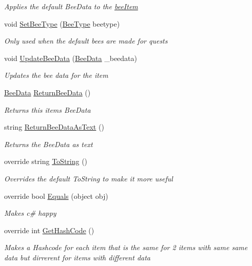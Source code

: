 \begin{DoxyCompactItemize}
\begin{DoxyCompactList}\small\item\em Applies the default Bee\+Data to the \hyperlink{struct_bee_game_1_1_items_1_1_item_a0593f3b7b3ff5daa864f3c6d0ccd77ca}{bee\+Item} \end{DoxyCompactList}\item 
void \hyperlink{struct_bee_game_1_1_items_1_1_item_a80c66aa30f64c498640a4b0ba1ec37b0}{Set\+Bee\+Type} (\hyperlink{namespace_bee_game_1_1_enums_a9376a1582db99d20c756e24de728944f}{Bee\+Type} beetype)
\begin{DoxyCompactList}\small\item\em Only used when the default bees are made for quests \end{DoxyCompactList}\item 
void \hyperlink{struct_bee_game_1_1_items_1_1_item_a4bc320f90a3fb06467046eedeb88ed13}{Update\+Bee\+Data} (\hyperlink{struct_bee_game_1_1_bee_1_1_bee_data}{Bee\+Data} \+\_\+beedata)
\begin{DoxyCompactList}\small\item\em Updates the bee data for the item \end{DoxyCompactList}\item 
\hyperlink{struct_bee_game_1_1_bee_1_1_bee_data}{Bee\+Data} \hyperlink{struct_bee_game_1_1_items_1_1_item_a3751a7c44aa4ff5975f1487ade757d9f}{Return\+Bee\+Data} ()
\begin{DoxyCompactList}\small\item\em Returns this items Bee\+Data \end{DoxyCompactList}\item 
string \hyperlink{struct_bee_game_1_1_items_1_1_item_a1c2f63541269f310381704fc7cc5bc5d}{Return\+Bee\+Data\+As\+Text} ()
\begin{DoxyCompactList}\small\item\em Returns the Bee\+Data as text \end{DoxyCompactList}\item 
override string \hyperlink{struct_bee_game_1_1_items_1_1_item_ac8039eff360bc9120180a54a0aaf13d8}{To\+String} ()
\begin{DoxyCompactList}\small\item\em Overrides the default To\+String to make it more useful \end{DoxyCompactList}\item 
override bool \hyperlink{struct_bee_game_1_1_items_1_1_item_adb0ce56e232551efc18b4e4c6e3fc1ae}{Equals} (object obj)
\begin{DoxyCompactList}\small\item\em Makes c\# happy \end{DoxyCompactList}\item 
override int \hyperlink{struct_bee_game_1_1_items_1_1_item_a6fc3c59404158c419ce0128802cbad60}{Get\+Hash\+Code} ()
\begin{DoxyCompactList}\small\item\em Makes a Hashcode for each item that is the same for 2 items with same same data but dirrerent for items with different data \end{DoxyCompactList}\end{DoxyCompactItemize}
